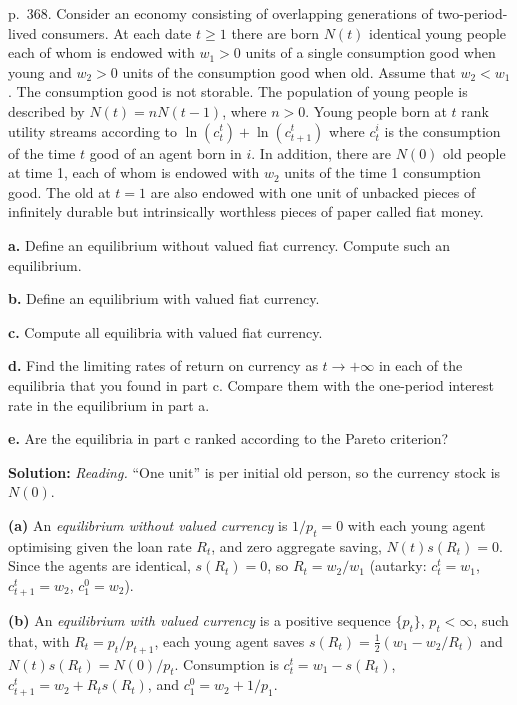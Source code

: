 \documentclass[12pt, letterpaper]{article}
\begin{document}
\begin{tcolorbox}[oddbox,title={Exercise 9.5 \quad All monetary equilibria with growth}]
\begin{tcolorbox}[questionbox]
p.~368. Consider an economy consisting of overlapping generations of two-period-lived consumers. At
each date $t\ge1$ there are born $N(t)$ identical young people each of whom is endowed with $w_1>0$
units of a single consumption good when young and $w_2>0$ units of the consumption good when old.
Assume that $w_2<w_1$. The consumption good is not storable. The population of young people is
described by $N(t)=nN(t-1)$, where $n>0$. Young people born at $t$ rank utility streams according to
$\ln(c_t^t)+\ln(c_{t+1}^t)$ where $c_t^i$ is the consumption of the time $t$ good of an agent born in
$i$. In addition, there are $N(0)$ old people at time 1, each of whom is endowed with $w_2$ units of
the time 1 consumption good. The old at $t=1$ are also endowed with one unit of unbacked pieces of
infinitely durable but intrinsically worthless pieces of paper called fiat money.

\textbf{a.} Define an equilibrium without valued fiat currency. Compute such an equilibrium.

\textbf{b.} Define an equilibrium with valued fiat currency.

\textbf{c.} Compute all equilibria with valued fiat currency.

\textbf{d.} Find the limiting rates of return on currency as $t\to+\infty$ in each of the equilibria
that you found in part c. Compare them with the one-period interest rate in the equilibrium in part a.

\textbf{e.} Are the equilibria in part c ranked according to the Pareto criterion?
\end{tcolorbox}

\textbf{Solution:} \emph{Reading.} ``One unit'' is per initial old person, so the currency stock is
$N(0)$.

\textbf{(a)} An \emph{equilibrium without valued currency} is $1/p_t=0$ with each young agent
optimising given the loan rate $R_t$, and zero aggregate saving, $N(t)s(R_t)=0$. Since the agents are
identical, $s(R_t)=0$, so $R_t=w_2/w_1$ (autarky: $c_t^t=w_1$, $c_{t+1}^t=w_2$, $c_1^0=w_2$).

\textbf{(b)} An \emph{equilibrium with valued currency} is a positive sequence $\{p_t\}$, $p_t<\infty$,
such that, with $R_t=p_t/p_{t+1}$, each young agent saves $s(R_t)=\frac12(w_1-w_2/R_t)$ and
$N(t)s(R_t)=N(0)/p_t$. Consumption is $c_t^t=w_1-s(R_t)$, $c_{t+1}^t=w_2+R_ts(R_t)$, and
$c_1^0=w_2+1/p_1$.


\end{tcolorbox}
\end{document}
